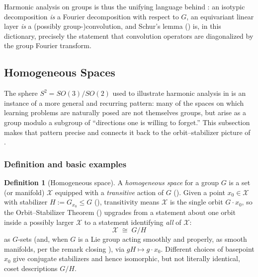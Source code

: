 \documentclass[11pt]{article}
\theoremstyle{plain}
\theoremstyle{definition}
\newtheorem{Definition}{Definition}[section]
\begin{document}
Harmonic analysis on groups is thus the unifying language behind
: an isotypic decomposition
\emph{is} a Fourier decomposition with respect to $G$, an equivariant linear
layer \emph{is} a (possibly group-)convolution, and Schur's lemma
() is, in this dictionary, precisely the statement that
convolution operators are diagonalized by the group Fourier transform.



\subsection{Homogeneous Spaces}
\label{subsec:homogeneous-spaces}

The sphere $S^2 = SO(3)/SO(2)$ used to illustrate harmonic analysis in
 is an instance of a more
general and recurring pattern: many of the spaces on which learning problems
are naturally posed are not themselves groups, but arise as a group modulo
a subgroup of ``directions one is willing to forget.'' This subsection makes
that pattern precise and connects it back to the orbit--stabilizer picture
of .

\subsubsection{Definition and basic examples}
\label{subsubsec:homogeneous-spaces-def}

\begin{Definition}[Homogeneous space]
\label{def:homogeneous-space}
A \emph{homogeneous space} for a group $G$ is a set (or manifold) $\mathcal{X}$
equipped with a \emph{transitive} action of $G$
(). Given a point $x_0 \in \mathcal{X}$ with
stabilizer $H := G_{x_0} \leq G$ (),
transitivity means $\mathcal{X}$ is the single orbit $G \cdot x_0$, so the
Orbit--Stabilizer Theorem () upgrades from
a statement about one orbit inside a possibly larger $\mathcal{X}$ to a statement
identifying \emph{all} of $\mathcal{X}$:
\[
    \mathcal{X} \;\cong\; G / H
\]
as $G$-sets (and, when $G$ is a Lie group acting smoothly and properly, as
smooth manifolds, per the remark closing
), via $gH \mapsto g \cdot x_0$. Different choices
of basepoint $x_0$ give conjugate stabilizers and hence isomorphic, but not
literally identical, coset descriptions $G/H$.
\end{Definition}
\end{document}
